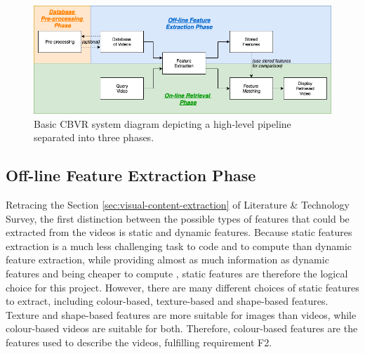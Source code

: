 \begin{figure}[h]
\centerline{\includegraphics[width=1.1\textwidth]{figures/design/basic_cbvr_phases.png}}
\caption{\label{fig:basic-cbvr-diagram}Basic CBVR system diagram depicting a high-level pipeline separated into three phases.}
\end{figure}

\subsection{Off-line Feature Extraction Phase}
\label{sec:design-offline-feature-extraction}

Retracing the Section \ref{sec:visual-content-extraction} of Literature \& Technology Survey, the first distinction between the possible types of features that could be extracted from the videos is static and dynamic features. Because static features extraction is a much less challenging task to code and to compute than dynamic feature extraction, while providing almost as much information as dynamic features and being cheaper to compute \cite{hu2011survey}, static features are therefore the logical choice for this project. However, there are many different choices of static features to extract, including colour-based, texture-based and shape-based features. Texture and shape-based features are more suitable for images than videos, while colour-based videos are suitable for both. Therefore, colour-based features are the features used to describe the videos, fulfilling requirement F2.\\

